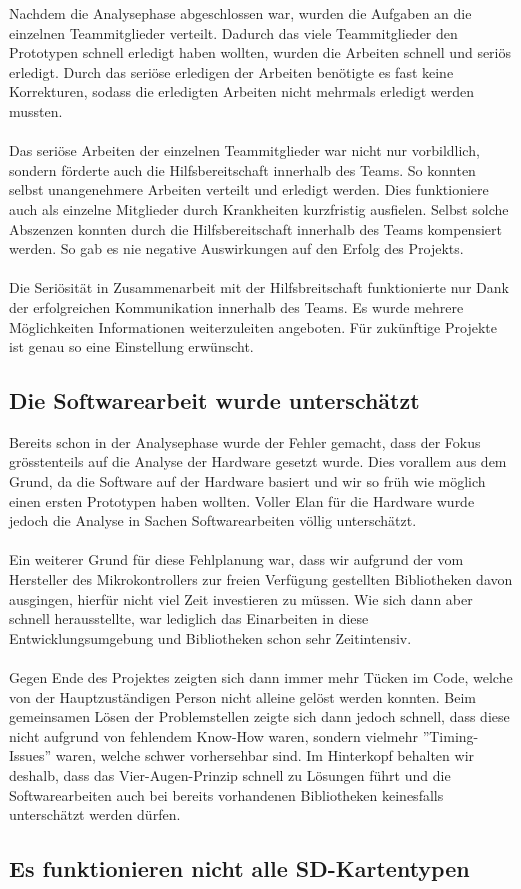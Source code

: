 Nachdem die Analysephase abgeschlossen war, wurden die Aufgaben an die einzelnen Teammitglieder verteilt. 
Dadurch das viele Teammitglieder den Prototypen schnell erledigt haben wollten, wurden die Arbeiten schnell und seriös erledigt. Durch das seriöse erledigen der Arbeiten benötigte es fast keine Korrekturen, sodass die erledigten Arbeiten nicht mehrmals erledigt werden mussten.\\
\\
Das seriöse Arbeiten der einzelnen Teammitglieder war nicht nur vorbildlich, sondern förderte auch die Hilfsbereitschaft innerhalb des Teams. So konnten selbst unangenehmere Arbeiten verteilt und erledigt werden. Dies funktioniere auch als einzelne Mitglieder durch Krankheiten kurzfristig ausfielen. Selbst solche Abszenzen konnten durch die Hilfsbereitschaft innerhalb des Teams kompensiert werden. So gab es nie negative Auswirkungen auf den Erfolg des Projekts.\\
\\
Die Seriösität in Zusammenarbeit mit der Hilfsbreitschaft funktionierte nur Dank der erfolgreichen Kommunikation innerhalb des Teams. Es wurde mehrere Möglichkeiten Informationen weiterzuleiten angeboten. Für zukünftige Projekte ist genau so eine Einstellung erwünscht. 

\subsection{Die Softwarearbeit wurde unterschätzt}

Bereits schon in der Analysephase wurde der Fehler gemacht, dass der Fokus grösstenteils auf die Analyse der Hardware gesetzt wurde. Dies vorallem aus dem Grund, da die Software auf der Hardware basiert und wir so früh wie möglich einen ersten Prototypen haben wollten. Voller Elan für die Hardware wurde jedoch die Analyse in Sachen Softwarearbeiten völlig unterschätzt.\\
\\
Ein weiterer Grund für diese Fehlplanung war, dass wir aufgrund der vom Hersteller des Mikrokontrollers zur freien Verfügung gestellten Bibliotheken davon ausgingen, hierfür nicht viel Zeit investieren zu müssen. Wie sich dann aber schnell herausstellte, war lediglich das Einarbeiten in diese Entwicklungsumgebung und Bibliotheken schon sehr Zeitintensiv.\\
\\
Gegen Ende des Projektes zeigten sich dann immer mehr Tücken im Code, welche von der Hauptzuständigen Person nicht alleine gelöst werden konnten. Beim gemeinsamen Lösen der Problemstellen zeigte sich dann jedoch schnell, dass diese nicht aufgrund von fehlendem Know-How waren, sondern vielmehr ''Timing-Issues'' waren, welche schwer vorhersehbar sind. Im Hinterkopf behalten wir deshalb, dass das Vier-Augen-Prinzip schnell zu Lösungen führt und die Softwarearbeiten auch bei bereits vorhandenen Bibliotheken keinesfalls unterschätzt werden dürfen.


\subsection{Es funktionieren nicht alle SD-Kartentypen}
